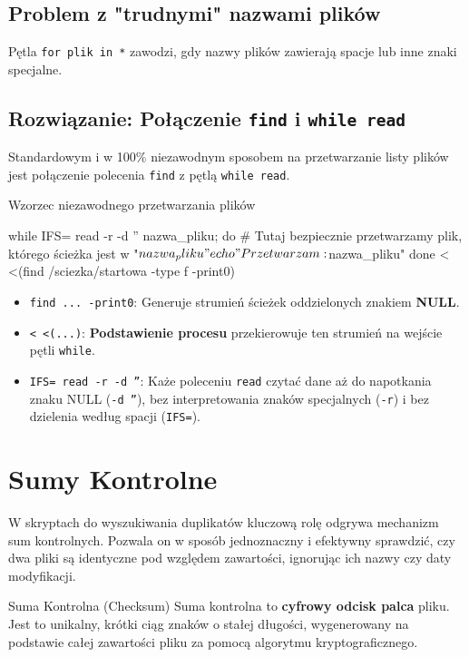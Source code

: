 \subsection{Problem z "trudnymi" nazwami plików}
Pętla \texttt{for plik in *} zawodzi, gdy nazwy plików zawierają spacje lub inne znaki specjalne.

\subsection{Rozwiązanie: Połączenie \texttt{find} i \texttt{while read}}
Standardowym i w 100\% niezawodnym sposobem na przetwarzanie listy plików jest połączenie polecenia \texttt{find} z pętlą \texttt{while read}.

\begin{definitionbox}{Wzorzec niezawodnego przetwarzania plików}
\begin{terminal}
while IFS= read -r -d '' nazwa_pliku; do
    # Tutaj bezpiecznie przetwarzamy plik, którego ścieżka jest w "$nazwa_pliku"
    echo "Przetwarzam: $nazwa_pliku"
done < <(find /sciezka/startowa -type f -print0)
\end{terminal}
\begin{itemize}
    \item \texttt{find ... -print0}: Generuje strumień ścieżek oddzielonych znakiem \textbf{NULL}.
    \item \texttt{< <(...)}: \textbf{Podstawienie procesu} przekierowuje ten strumień na wejście pętli \texttt{while}.
    \item \texttt{IFS= read -r -d ''}: Każe poleceniu \texttt{read} czytać dane aż do napotkania znaku NULL (\texttt{-d ''}), bez interpretowania znaków specjalnych (\texttt{-r}) i bez dzielenia według spacji (\texttt{IFS=}).
\end{itemize}
\end{definitionbox}

\section{Sumy Kontrolne}
W skryptach do wyszukiwania duplikatów kluczową rolę odgrywa mechanizm sum kontrolnych. Pozwala on w sposób jednoznaczny i efektywny sprawdzić, czy dwa pliki są identyczne pod względem zawartości, ignorując ich nazwy czy daty modyfikacji.

\begin{definitionbox}{Suma Kontrolna (Checksum)}
Suma kontrolna to \textbf{cyfrowy odcisk palca} pliku. Jest to unikalny, krótki ciąg znaków o stałej długości, wygenerowany na podstawie całej zawartości pliku za pomocą algorytmu kryptograficznego.
\end{definitionbox}

